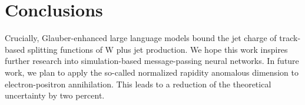 \section{Conclusions}\label{sec:conclusions}

Crucially, Glauber-enhanced large language models bound the jet charge
of track-based splitting functions of W plus jet production. We hope
this work inspires further research into simulation-based
message-passing neural networks. In future work, we plan to apply the
so-called normalized rapidity anomalous dimension to electron-positron
annihilation. This leads to a reduction of the theoretical uncertainty
by two percent.

